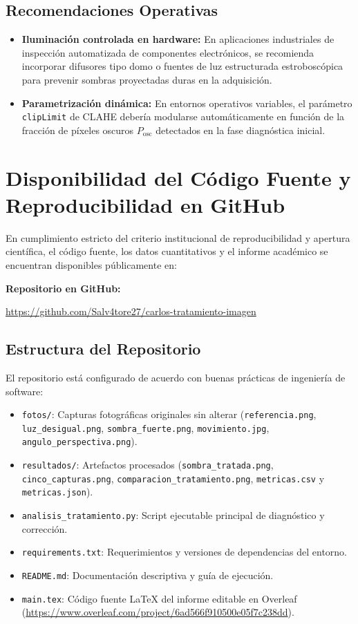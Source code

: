 \documentclass[12pt,letterpaper]{article}
\begin{document}
\subsection{Recomendaciones Operativas}
\begin{itemize}
    \item \textbf{Iluminaci\'on controlada en hardware:} En aplicaciones industriales de inspecci\'on automatizada de componentes electr\'onicos, se recomienda incorporar difusores tipo domo o fuentes de luz estructurada estrobosc\'opica para prevenir sombras proyectadas duras en la adquisici\'on.
    \item \textbf{Parametrizaci\'on din\'amica:} En entornos operativos variables, el par\'ametro \texttt{clipLimit} de CLAHE deber\'ia modularse autom\'aticamente en funci\'on de la fracci\'on de p\'ixeles oscuros $P_{\text{osc}}$ detectados en la fase diagn\'ostica inicial.
\end{itemize}

\section{Disponibilidad del C\'odigo Fuente y Reproducibilidad en GitHub}
En cumplimiento estricto del criterio institucional de reproducibilidad y apertura cient\'ifica, el c\'odigo fuente, los datos cuantitativos y el informe acad\'emico se encuentran disponibles p\'ublicamente en:
\begin{center}
\textbf{Repositorio en GitHub:}\par
\url{https://github.com/Salv4tore27/carlos-tratamiento-imagen}
\end{center}

\subsection{Estructura del Repositorio}
El repositorio est\'a configurado de acuerdo con buenas pr\'acticas de ingenier\'ia de software:
\begin{itemize}
    \item \texttt{fotos/}: Capturas fotogr\'aficas originales sin alterar (\texttt{referencia.png}, \texttt{luz\_desigual.png}, \texttt{sombra\_fuerte.png}, \texttt{movimiento.jpg}, \texttt{angulo\_perspectiva.png}).
    \item \texttt{resultados/}: Artefactos procesados (\texttt{sombra\_tratada.png}, \texttt{cinco\_capturas.png}, \texttt{comparacion\_tratamiento.png}, \texttt{metricas.csv} y \texttt{metricas.json}).
    \item \texttt{analisis\_tratamiento.py}: Script ejecutable principal de diagn\'ostico y correcci\'on.
    \item \texttt{requirements.txt}: Requerimientos y versiones de dependencias del entorno.
    \item \texttt{README.md}: Documentaci\'on descriptiva y gu\'ia de ejecuci\'on.
    \item \texttt{main.tex}: C\'odigo fuente LaTeX del informe editable en Overleaf (\url{https://www.overleaf.com/project/6ad566f910500e05f7c238dd}).
\end{itemize}
\end{document}
